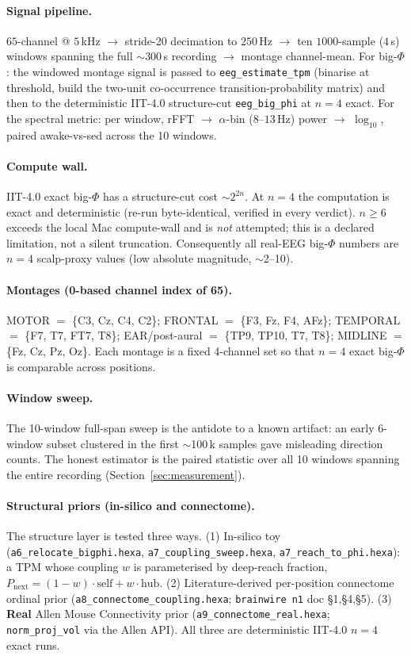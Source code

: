 \documentclass[11pt,a4paper]{article}
\begin{document}
\paragraph{Signal pipeline.}
$65$-channel @ $5\,$kHz $\to$ stride-20 decimation to $250\,$Hz $\to$
ten $1000$-sample ($4\,$s) windows spanning the full $\sim$300\,s recording
$\to$ montage channel-mean. For big-$\Phi$: the windowed montage signal is
passed to \texttt{eeg\_estimate\_tpm} (binarise at threshold, build the
two-unit co-occurrence transition-probability matrix) and then to the
deterministic IIT-4.0 structure-cut \texttt{eeg\_big\_phi} at $n{=}4$ exact.
For the spectral metric: per window, rFFT $\to$ $\alpha$-bin ($8$--$13\,$Hz)
power $\to$ $\log_{10}$, paired awake-vs-sed across the 10 windows.

\paragraph{Compute wall.}
IIT-4.0 exact big-$\Phi$ has a structure-cut cost $\sim2^{2n}$. At $n{=}4$ the
computation is exact and deterministic (re-run byte-identical, verified in
every verdict). $n{\ge}6$ exceeds the local Mac compute-wall and is
\emph{not} attempted; this is a declared limitation, not a silent truncation.
Consequently all real-EEG big-$\Phi$ numbers are $n{=}4$ scalp-proxy values
(low absolute magnitude, $\sim$2--10).

\paragraph{Montages (0-based channel index of 65).}
MOTOR $=$ \{C3, Cz, C4, C2\}; FRONTAL $=$ \{F3, Fz, F4, AFz\};
TEMPORAL $=$ \{F7, T7, FT7, T8\}; EAR/post-aural $=$ \{TP9, TP10, T7, T8\};
MIDLINE $=$ \{Fz, Cz, Pz, Oz\}. Each montage is a fixed 4-channel set so that
$n{=}4$ exact big-$\Phi$ is comparable across positions.

\paragraph{Window sweep.}
The 10-window full-span sweep is the antidote to a known artifact: an early
6-window subset clustered in the first $\sim$100\,k samples gave misleading
direction counts. The honest estimator is the paired statistic over all 10
windows spanning the entire recording (Section~\ref{sec:measurement}).

\paragraph{Structural priors (in-silico and connectome).}
The structure layer is tested three ways. (1) In-silico toy
(\texttt{a6\_relocate\_bigphi.hexa}, \texttt{a7\_coupling\_sweep.hexa},
\texttt{a7\_reach\_to\_phi.hexa}): a TPM whose coupling $w$ is parameterised by
deep-reach fraction, $P_{\text{next}}{=}(1{-}w)\cdot\text{self}{+}w\cdot\text{hub}$.
(2) Literature-derived per-position connectome ordinal prior
(\texttt{a8\_connectome\_coupling.hexa}; \texttt{brainwire n1} doc \S1,\S4,\S5).
(3) \textbf{Real} Allen Mouse Connectivity prior
(\texttt{a9\_connectome\_real.hexa}; \texttt{norm\_proj\_vol} via the Allen
API). All three are deterministic IIT-4.0 $n{=}4$ exact runs.
\end{document}
